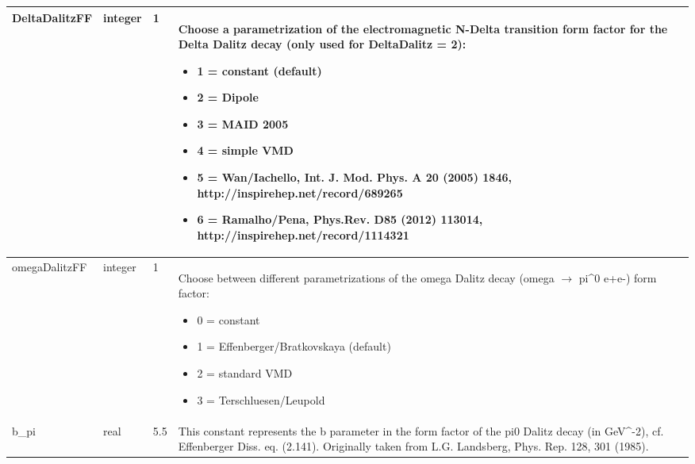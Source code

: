 \documentclass{article}
\begin{document}
\begin{longtable}{llll}
\midrule
DeltaDalitzFF & \begin{minipage}[t]{2cm}integer\end{minipage} & \begin{minipage}[t]{2cm}1\end{minipage} & \begin{minipage}[t]{12cm}Choose a parametrization of the electromagnetic N-Delta transition form factor for the Delta Dalitz decay (only used for DeltaDalitz = 2):\begin{itemize}\leftmargin0em\itemindent0pt\item 1 = constant (default)\item 2 = Dipole\item 3 = MAID 2005\item 4 = simple VMD\item 5 = Wan/Iachello, Int. J. Mod. Phys. A 20 (2005) 1846, http://inspirehep.net/record/689265\item 6 = Ramalho/Pena, Phys.Rev. D85 (2012) 113014, http://inspirehep.net/record/1114321\end{itemize}\end{minipage}\\*
\midrule
omegaDalitzFF & \begin{minipage}[t]{2cm}integer\end{minipage} & \begin{minipage}[t]{2cm}1\end{minipage} & \begin{minipage}[t]{12cm}Choose between different parametrizations of the omega Dalitz decay (omega $\rightarrow$ pi\^{}0 e+e-) form factor:\begin{itemize}\leftmargin0em\itemindent0pt\item 0 = constant\item 1 = Effenberger/Bratkovskaya (default)\item 2 = standard VMD\item 3 = Terschluesen/Leupold\end{itemize}\end{minipage}\\*
\midrule
b\_pi & \begin{minipage}[t]{2cm}real\end{minipage} & \begin{minipage}[t]{2cm}5.5\end{minipage} & \begin{minipage}[t]{12cm}This constant represents the b parameter in the form factor of the pi0 Dalitz decay (in GeV\^{}-2), cf. Effenberger Diss. eq. (2.141). Originally taken from L.G. Landsberg, Phys. Rep. 128, 301 (1985).\end{minipage}\\*

\end{longtable}
\end{document}
